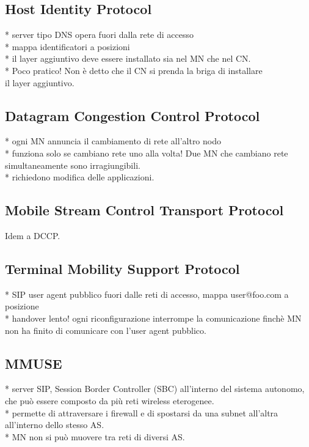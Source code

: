 \documentclass[12pt,a4paper,openright,twoside]{book}
\begin{document}
\subsection{Host Identity Protocol}
* server tipo DNS opera fuori dalla rete di accesso\\
* mappa identificatori a posizioni\\
* il layer aggiuntivo deve essere installato sia nel MN che nel
  CN.\\
* Poco pratico! Non è detto che il CN si prenda la briga di installare\\
  il layer aggiuntivo.\\

\subsection{Datagram Congestion Control Protocol}
* ogni MN annuncia il cambiamento di rete all'altro nodo\\
* funziona solo se cambiano rete uno alla volta! Due MN che cambiano
  rete simultaneamente sono irragiungibili.\\
* richiedono modifica delle applicazioni.\\

\subsection{Mobile Stream Control Transport Protocol}
Idem a DCCP.

\subsection{Terminal Mobility Support Protocol}
* SIP user agent pubblico fuori dalle reti di accesso, mappa
  user@foo.com a posizione\\
* handover lento! ogni riconfigurazione interrompe la comunicazione
  finchè MN non ha finito di comunicare con l'user agent pubblico.

\subsection{MMUSE}
* server SIP, Session Border Controller (SBC) all'interno del
  sistema autonomo, che può essere composto da più reti wireless
  eterogenee.\\
* permette di attraversare i firewall e di spostarsi da una subnet
  all'altra all'interno dello stesso AS.\\
* MN non si può muovere tra reti di diversi AS.\\
\end{document}
